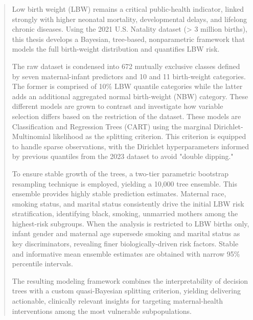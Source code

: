 \begin{abstract} 
Low birth weight (LBW) remains a critical public-health indicator, linked strongly with higher neonatal mortality, developmental delays, and lifelong chronic diseases. Using the 2021 U.S. Natality dataset (> 3 million births), this thesis develops a Bayesian, tree-based, nonparametric framework that models the full birth-weight distribution and quantifies LBW risk. 

The raw dataset is condensed into 672 mutually exclusive classes defined by seven maternal-infant predictors and 10 and 11 birth-weight categories. The former is comprised of 10\% LBW quantile categories while the latter adds an additional aggregated normal birth-weight (NBW) category. These different models are grown to contrast and investigate how variable selection differs based on the restriction of the dataset. These models are Classification and Regression Trees (CART) using the marginal Dirichlet-Multinomial likelihood as the splitting criterion. This criterion is equipped to handle sparse observations, with the Dirichlet hyperparameters informed by previous quantiles from the 2023 dataset to avoid "double dipping."

To ensure stable growth of the trees, a two-tier parametric bootstrap resampling technique is employed, yielding a 10,000 tree ensemble. This ensemble provides highly stable prediction estimates. Maternal race, smoking status, and marital status consistently drive the initial LBW risk stratification, identifying black, smoking, unmarried mothers among the highest-risk subgroups. When the analysis is restricted to LBW births only, infant gender and maternal age supersede smoking and marital status as key discriminators, revealing finer biologically-driven risk factors. Stable and informative mean ensemble estimates are obtained with narrow 95\% percentile intervals.



The resulting modeling framework combines the interpretability of decision trees with a custom quasi-Bayesian splitting criterion, yielding delivering actionable, clinically relevant insights for targeting maternal-health interventions among the most vulnerable subpopulations.
\end{abstract}